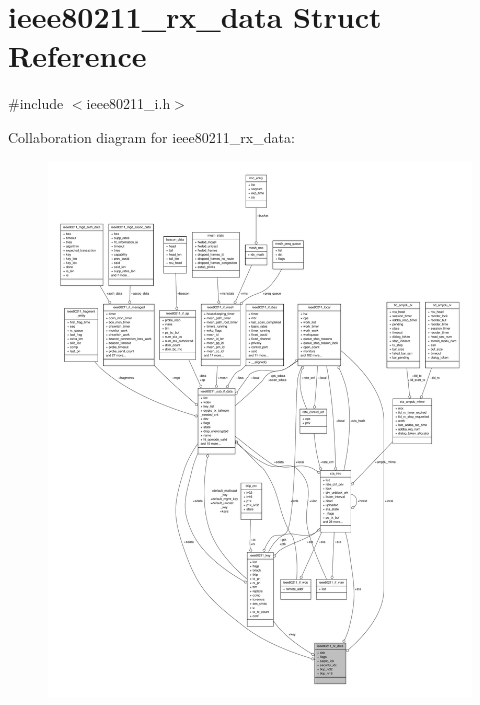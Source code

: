 \hypertarget{structieee80211__rx__data}{\section{ieee80211\-\_\-rx\-\_\-data Struct Reference}
\label{structieee80211__rx__data}
}


{\ttfamily \#include $<$ieee80211\-\_\-i.\-h$>$}



Collaboration diagram for ieee80211\-\_\-rx\-\_\-data\-:
\nopagebreak
\begin{figure}[H]
\begin{center}
\leavevmode
\includegraphics[width=350pt]{structieee80211__rx__data__coll__graph}
\end{center}
\end{figure}
